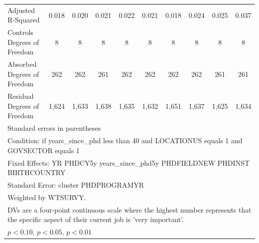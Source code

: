 \begin{table}[htbp]
\begin{tabular}{l*{9}{c}}
Adjusted R-Squared&       0.018         &       0.020         &       0.021         &       0.022         &       0.021         &       0.018         &       0.024         &       0.025         &       0.037         \\
Controls Degrees of Freedom&           8         &           8         &           8         &           8         &           8         &           8         &           8         &           8         &           8         \\
Absorbed Degrees of Freedom&         262         &         262         &         261         &         262         &         262         &         262         &         262         &         261         &         261         \\
Residual Degrees of Freedom&       1,624         &       1,633         &       1,638         &       1,635         &       1,632         &       1,651         &       1,637         &       1,625         &       1,634         \\
\hline\hline
\multicolumn{10}{l}{\footnotesize Standard errors in parentheses}\\
\multicolumn{10}{l}{\footnotesize Condition: if years\_since\_phd less than 40 and LOCATIONUS equals 1 and GOVSECTOR equals 1}\\
\multicolumn{10}{l}{\footnotesize Fixed Effects: YR PHDCY5y years\_since\_phd5y PHDFIELDNEW PHDINST BIRTHCOUNTRY}\\
\multicolumn{10}{l}{\footnotesize Standard Error: cluster PHDPROGRAMYR}\\
\multicolumn{10}{l}{\footnotesize Weighted by WTSURVY.}\\
\multicolumn{10}{l}{\footnotesize DVs are a four-point continuous scale where the highest number represents that the specific aspect of their current job is 'very important'.}\\
\multicolumn{10}{l}{\footnotesize \sym{*} \(p<0.10\), \sym{**} \(p<0.05\), \sym{***} \(p<0.01\)}\\
\end{tabular}
\end{table}
